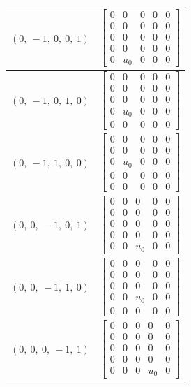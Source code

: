 \documentclass[11pt]{article}
\theoremstyle{definition}
\begin{document}
\begin{tabular}{|l|c|}
    \hline
    $\left( 0, \  -1, \  0, \  0, \  1\right)$ & $\left[\begin{matrix}0 & 0 & 0 & 0 & 0\\0 & 0 & 0 & 0 & 0\\0 & 0 & 0 & 0 & 0\\0 & 0 & 0 & 0 & 0\\0 & u_{0} & 0 & 0 & 0\end{matrix}\right]$ \\
    \hline
    $\left( 0, \  -1, \  0, \  1, \  0\right)$ & $\left[\begin{matrix}0 & 0 & 0 & 0 & 0\\0 & 0 & 0 & 0 & 0\\0 & 0 & 0 & 0 & 0\\0 & u_{0} & 0 & 0 & 0\\0 & 0 & 0 & 0 & 0\end{matrix}\right]$ \\
    \hline
    $\left( 0, \  -1, \  1, \  0, \  0\right)$ & $\left[\begin{matrix}0 & 0 & 0 & 0 & 0\\0 & 0 & 0 & 0 & 0\\0 & u_{0} & 0 & 0 & 0\\0 & 0 & 0 & 0 & 0\\0 & 0 & 0 & 0 & 0\end{matrix}\right]$ \\
    \hline
    $\left( 0, \  0, \  -1, \  0, \  1\right)$ & $\left[\begin{matrix}0 & 0 & 0 & 0 & 0\\0 & 0 & 0 & 0 & 0\\0 & 0 & 0 & 0 & 0\\0 & 0 & 0 & 0 & 0\\0 & 0 & u_{0} & 0 & 0\end{matrix}\right]$ \\
    \hline
    $\left( 0, \  0, \  -1, \  1, \  0\right)$ & $\left[\begin{matrix}0 & 0 & 0 & 0 & 0\\0 & 0 & 0 & 0 & 0\\0 & 0 & 0 & 0 & 0\\0 & 0 & u_{0} & 0 & 0\\0 & 0 & 0 & 0 & 0\end{matrix}\right]$ \\
    \hline
    $\left( 0, \  0, \  0, \  -1, \  1\right)$ & $\left[\begin{matrix}0 & 0 & 0 & 0 & 0\\0 & 0 & 0 & 0 & 0\\0 & 0 & 0 & 0 & 0\\0 & 0 & 0 & 0 & 0\\0 & 0 & 0 & u_{0} & 0\end{matrix}\right]$ \\

\end{tabular}
\end{document}
